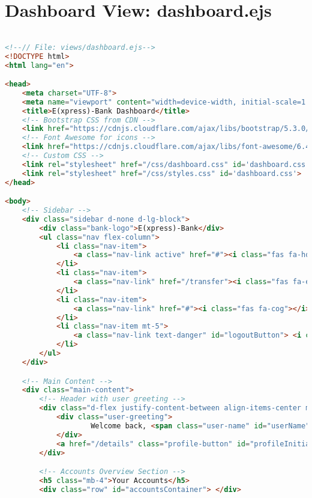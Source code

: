 \section{Dashboard View: dashboard.ejs}
\begin{lstlisting}[language=HTML]

<!--// File: views/dashboard.ejs-->
<!DOCTYPE html>
<html lang="en">

<head>
    <meta charset="UTF-8">
    <meta name="viewport" content="width=device-width, initial-scale=1.0">
    <title>E(xpress)-Bank Dashboard</title>
    <!-- Bootstrap CSS from CDN -->
    <link href="https://cdnjs.cloudflare.com/ajax/libs/bootstrap/5.3.0/css/bootstrap.min.css" rel="stylesheet">
    <!-- Font Awesome for icons -->
    <link href="https://cdnjs.cloudflare.com/ajax/libs/font-awesome/6.4.0/css/all.min.css" rel="stylesheet">
    <!-- Custom CSS -->
    <link rel="stylesheet" href="/css/dashboard.css" id='dashboard.css'>
    <link rel="stylesheet" href="/css/styles.css" id='dashboard.css'>
</head>

<body>
    <!-- Sidebar -->
    <div class="sidebar d-none d-lg-block">
        <div class="bank-logo">E(xpress)-Bank</div>
        <ul class="nav flex-column">
            <li class="nav-item">
                <a class="nav-link active" href="#"><i class="fas fa-home"></i> Dashboard</a>
            </li>
            <li class="nav-item">
                <a class="nav-link" href="/transfer"><i class="fas fa-exchange-alt"></i> Transfers</a>
            </li>
            <li class="nav-item">
                <a class="nav-link" href="#"><i class="fas fa-cog"></i> Settings</a>
            </li>
            <li class="nav-item mt-5">
                <a class="nav-link text-danger" id="logoutButton"> <i class="fas fa-sign-out-alt" onclick="logout()"></i> Logout</a>
            </li>
        </ul>
    </div>

    <!-- Main Content -->
    <div class="main-content">
        <!-- Header with user greeting -->
        <div class="d-flex justify-content-between align-items-center mb-4">
            <div class="user-greeting">
                    Welcome back, <span class="user-name" id="userName"><%- user %></span>!
            </div>
            <a href="/details" class="profile-button" id="profileInitials">U</a>
        </div>

        <!-- Accounts Overview Section -->
        <h5 class="mb-4">Your Accounts</h5>
        <div class="row" id="accountsContainer"> </div>


\end{lstlisting}
